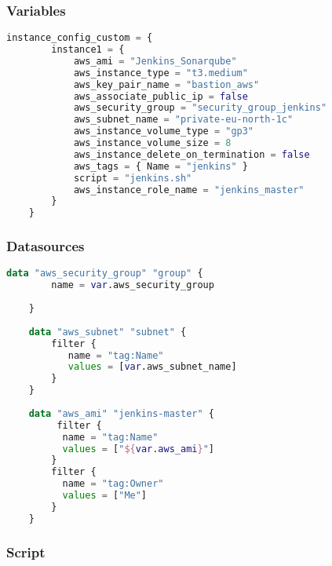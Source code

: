 \subsubsection{
{Variables}}

\begin{lstlisting}[language=terraform]
    instance_config_custom = {
        instance1 = {
            aws_ami = "Jenkins_Sonarqube"
            aws_instance_type = "t3.medium"
            aws_key_pair_name = "bastion_aws"
            aws_associate_public_ip = false
            aws_security_group = "security_group_jenkins"
            aws_subnet_name = "private-eu-north-1c"
            aws_instance_volume_type = "gp3"
            aws_instance_volume_size = 8
            aws_instance_delete_on_termination = false
            aws_tags = { Name = "jenkins" }
            script = "jenkins.sh"
            aws_instance_role_name = "jenkins_master"
        }
    }  
\end{lstlisting}

\subsubsection{
{Datasources}}

\begin{lstlisting}[language=terraform]
    data "aws_security_group" "group" {
        name = var.aws_security_group
      
    }
    
    data "aws_subnet" "subnet" {
        filter {
           name = "tag:Name"
           values = [var.aws_subnet_name]
        }
    }
    
    data "aws_ami" "jenkins-master" { 
         filter {
          name = "tag:Name"
          values = ["${var.aws_ami}"]
        }
        filter {
          name = "tag:Owner"
          values = ["Me"]
        }
    } 
\end{lstlisting}

\subsubsection{
{Script}}

